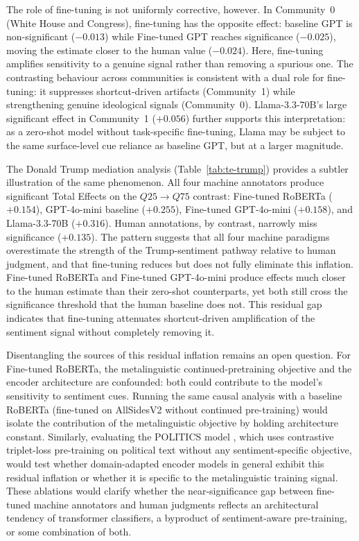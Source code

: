 The role of fine-tuning is not uniformly corrective, however. In Community~0 (White House and Congress), fine-tuning has the opposite effect: baseline GPT is non-significant ($-0.013$) while Fine-tuned GPT reaches significance ($-0.025$), moving the estimate closer to the human value ($-0.024$). Here, fine-tuning amplifies sensitivity to a genuine signal rather than removing a spurious one. The contrasting behaviour across communities is consistent with a dual role for fine-tuning: it suppresses shortcut-driven artifacts (Community~1) while strengthening genuine ideological signals (Community~0). Llama-3.3-70B's large significant effect in Community~1 ($+0.056$) further supports this interpretation: as a zero-shot model without task-specific fine-tuning, Llama may be subject to the same surface-level cue reliance as baseline GPT, but at a larger magnitude.

The Donald Trump mediation analysis (Table~\ref{tab:te-trump}) provides a subtler illustration of the same phenomenon. All four machine annotators produce significant Total Effects on the $Q25 \to Q75$ contrast: Fine-tuned RoBERTa ($+0.154$), GPT-4o-mini baseline ($+0.255$), Fine-tuned GPT-4o-mini ($+0.158$), and Llama-3.3-70B ($+0.316$). Human annotations, by contrast, narrowly miss significance ($+0.135$). The pattern suggests that all four machine paradigms overestimate the strength of the Trump-sentiment pathway relative to human judgment, and that fine-tuning reduces but does not fully eliminate this inflation. Fine-tuned RoBERTa and Fine-tuned GPT-4o-mini produce effects much closer to the human estimate than their zero-shot counterparts, yet both still cross the significance threshold that the human baseline does not. This residual gap indicates that fine-tuning attenuates shortcut-driven amplification of the sentiment signal without completely removing it.

Disentangling the sources of this residual inflation remains an open question. For Fine-tuned RoBERTa, the metalinguistic continued-pretraining objective and the encoder architecture are confounded: both could contribute to the model's sensitivity to sentiment cues. Running the same causal analysis with a baseline RoBERTa (fine-tuned on AllSidesV2 without continued pre-training) would isolate the contribution of the metalinguistic objective by holding architecture constant. Similarly, evaluating the POLITICS model \citep{liu2022politics}, which uses contrastive triplet-loss pre-training on political text without any sentiment-specific objective, would test whether domain-adapted encoder models in general exhibit this residual inflation or whether it is specific to the metalinguistic training signal. These ablations would clarify whether the near-significance gap between fine-tuned machine annotators and human judgments reflects an architectural tendency of transformer classifiers, a byproduct of sentiment-aware pre-training, or some combination of both.

